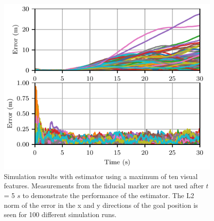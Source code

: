 \begin{figure}
  \centering
  \includegraphics[width=5.5in]{plots/mc_both_xy_err}
  \caption{Simulation results with estimator using a maximum of ten visual
  features. Measurements from the fiducial marker are not used after $t$ = 5
$s$ to demonstrate the performance of the estimator. The L2 norm of the error in
the x and y directions of the goal position is seen for 100 different simulation
runs.}
  \label{fig:mc_with_lms_xy_err}
\end{figure}

